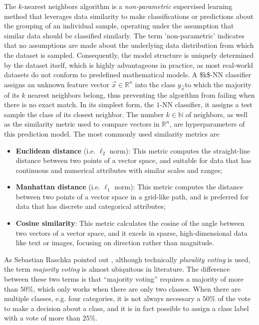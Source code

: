 The $k$-nearest neighbors algorithm is a \emph{non-parametric} supervised learning method that leverages data similarity to make classifications or predictions about the grouping of an individual sample, operating under the assumption that similar data should be classified similarly. The term 'non-parametric' indicates that no assumptions are made about the underlying data distribution from which the dataset is sampled. Consequently, the model structure is uniquely determined by the dataset itself, which is highly advantageous in practice, as most real-world datasets do not conform to predefined mathematical models. A \acs{$k$-NN} classifier assigns an unknown feature vector $\vec{x} \in \mathbb{R}^n$ into the class $y_{\vec{x}}$​ to which the majority of its $k$ nearest neighbors belong, thus preventing the algorithm from failing when there is no exact match. In its simplest form, the $1$-NN classifier, it assigns a test sample the class of its closest neighbor. The number $k \in \mathbb{N}$  of neighbors, as well as the similarity metric used to compare vectors in $\mathbb{R}^n$, are hyperparameters of this prediction model. The most commonly used similarity metrics are


\begin{itemize}
  \item \textbf{Euclidean distance} (i.e. $\ell_2$ norm): This metric computes the straight-line distance between two points of a vector space, and suitable for data that has continuous and numerical attributes with similar scales and ranges;
  \item \textbf{Manhattan distance} (i.e. $\ell_1$ norm): This metric computes the distance between two points of a vector space in a grid-like path, and is preferred for data that has discrete and categorical attributes;
  \item \textbf{Cosine similarity}: This metric calculates the cosine of the angle between two vectors of a vector space, and it excels in sparse, high-dimensional data like text or images, focusing on direction rather than magnitude.
\end{itemize}

As Sebastian Raschka pointed out \cite{raschka2018stat}, although technically \emph{plurality voting} is used, the term \emph{majority voting} is almost ubiquitous in literature. The difference between these two terms is that ``majority voting'' requires a majority of more than $50\%$, which only works when there are only two classes. When there are multiple classes, e.g. four categories, it is not always necessary a $50\%$ of the vote to make a decision about a class, and it is in fact possible to assign a class label with a vote of more than $25\%$.

